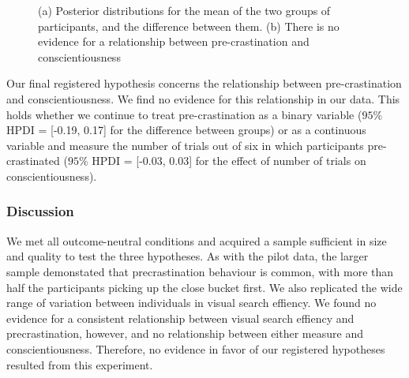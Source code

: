 \documentclass[]{rsos}
\begin{document}
\begin{figure}[t]
  \centering  
{}
  \caption{(a) Posterior distributions for the mean of the two groups of participants, and the difference between them. (b) There is no evidence for a relationship between pre-crastination and conscientiousness}
  \label{fig:full_exp_strategy}
\end{figure}

Our final registered hypothesis concerns the relationship between pre-crastination and conscientiousness. We find no evidence for this relationship in our data. This holds whether we continue to treat pre-crastination as a binary variable ($95\%$ HPDI = [-0.19, 0.17] for the difference between groups) or as a continuous variable and measure the number of trials out of six in which participants pre-crastinated ($95\%$ HPDI = [-0.03, 0.03] for the effect of number of trials on conscientiousness).


\subsubsection{Discussion}

We met all outcome-neutral conditions and acquired a sample sufficient in size and quality to test the three hypotheses. As with the pilot data, the larger sample demonstated that precrastination behaviour is common, with more than half the participants picking up the close bucket first. We also replicated the wide range of variation between individuals in visual search effiency. We found no evidence for a consistent relationship between visual search effiency and precrastination, however, and no relationship between either measure and conscientiousness. Therefore, no evidence in favor of our registered hypotheses resulted from this experiment. 
\end{document}
